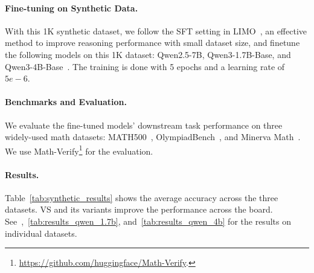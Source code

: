 \paragraph{Fine-tuning on Synthetic Data.} With this 1K synthetic dataset, we follow the SFT setting in LIMO~\citep{ye2025limoreasoning}, an effective method to improve reasoning performance with small dataset size, and finetune the following models on this 1K dataset: Qwen2.5-7B, Qwen3-1.7B-Base, and Qwen3-4B-Base~\citep{qwen2025qwen25technicalreport, yang2025qwen3technicalreport}. The training is done with 5 epochs and a learning rate of $5e-6$. 

\paragraph{Benchmarks and Evaluation.} We evaluate the fine-tuned models' downstream task performance on three widely-used math datasets: MATH500~\citep{hendrycksmath2021}, OlympiadBench~\citep{he2024olympiadbench}, and Minerva Math~\citep{lewkowycz2022solving}. We use Math-Verify\footnote{\url{https://github.com/huggingface/Math-Verify}.} for the evaluation. 


\paragraph{Results.}
Table~\ref{tab:synthetic_results} shows the average accuracy across the three datasets. VS and its variants improve the performance across the board. See~,~\ref{tab:results_qwen_1.7b}, and~\ref{tab:results_qwen_4b} for the results on individual datasets.



